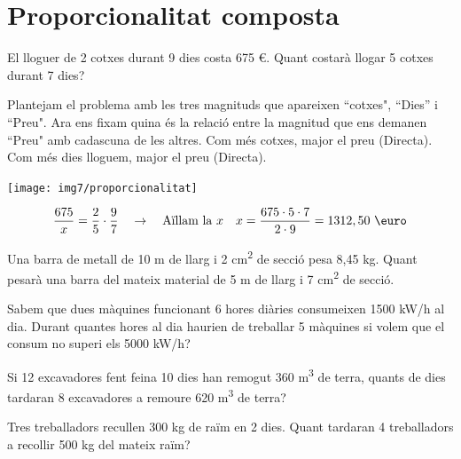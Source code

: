 \section{Proporcionalitat composta}


\begin{mylist}
	\exer El lloguer de 2 cotxes durant 9
dies costa 675 \euro{}. Quant costarà llogar 5 cotxes durant 7 dies?
\end{mylist}
	\vspace{-0.25cm}
	
\begin{example}
	\begin{minipage}{0.6\textwidth}
		Plantejam el problema amb les tres magnituds que apareixen ``cotxes", ``Dies'' i ``Preu". 
		Ara ens fixam quina és la relació entre la magnitud que ens demanen ``Preu" amb cadascuna de les altres.
		Com més cotxes, major el preu (Directa). Com més dies lloguem, major el preu (Directa).
		
	\end{minipage}
	\begin{minipage}{0.4\textwidth}
		\centering
		\texttt{[image: img7/proporcionalitat]}
	\end{minipage}
	
	\[ \frac{675}{x} = \frac{2}{5} \cdot \frac{9}{7} \quad \rightarrow \quad \text{Aïllam la }x \quad x=\frac{675\cdot 5 \cdot 7}{2\cdot 9}= 1312,50 \text{ \euro}  \]
\end{example}
 
 
 \begin{mylist}
 
 \exer
 Una barra de metall de 10 m de llarg i 2 cm\textsuperscript{2} de
 secció pesa 8,45 kg. Quant pesarà una barra del mateix material de 5 m
 de llarg i 7 cm\textsuperscript{2} de secció.
 
 
 \exer
 Sabem que dues màquines funcionant 6 hores diàries consumeixen 1500
 kW/h al dia. Durant quantes hores al dia haurien de treballar 5
 màquines si volem que el consum no superi els 5000 kW/h?
 
 
 \exer
 Si 12 excavadores fent feina 10 dies han remogut 360
 m\textsuperscript{3} de terra, quants de dies tardaran 8 excavadores a
 remoure 620 m\textsuperscript{3} de terra?
 
  
\exer Tres treballadors recullen 300 kg de raïm en 2 dies. Quant tardaran 4 treballadors a recollir 500 kg del mateix raïm?
 

\end{mylist}


